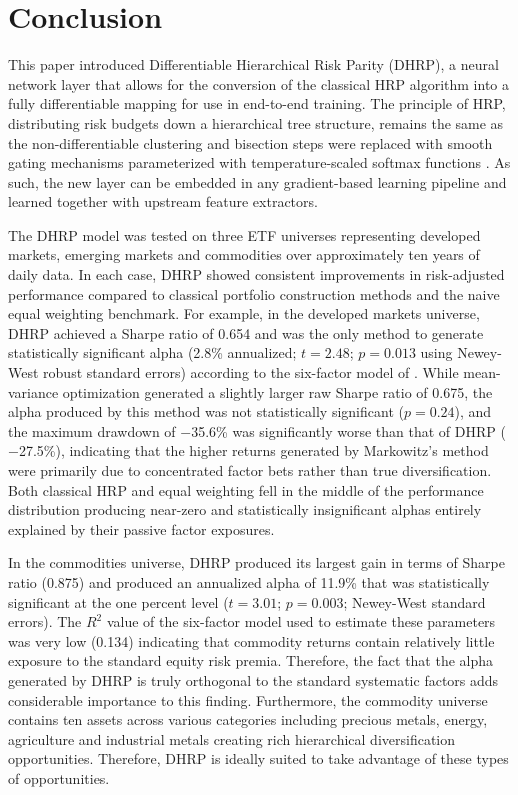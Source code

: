 \documentclass{article}
\begin{document}
\section{Conclusion}

This paper introduced Differentiable Hierarchical Risk Parity (DHRP), a neural network layer that allows for the conversion of the classical HRP algorithm \citep{LopezdePrado2016} into a fully differentiable mapping for use in end-to-end training. The principle of HRP, distributing risk budgets down a hierarchical tree structure, remains the same as the non-differentiable clustering and bisection steps were replaced with smooth gating mechanisms parameterized with temperature-scaled softmax functions \citep{Vaswani2017}. As such, the new layer can be embedded in any gradient-based learning pipeline and learned together with upstream feature extractors.

The DHRP model was tested on three ETF universes representing developed markets, emerging markets and commodities over approximately ten years of daily data. In each case, DHRP showed consistent improvements in risk-adjusted performance compared to classical portfolio construction methods and the naive equal weighting benchmark. For example, in the developed markets universe, DHRP achieved a Sharpe ratio of 0.654 and was the only method to generate statistically significant alpha (2.8\% annualized; $t=2.48$; $p=0.013$ using Newey-West robust standard errors) according to the six-factor model of \citet{FamaFrench2015, FamaFrench2018, Carhart1997}. While \citet{Markowitz1952} mean-variance optimization generated a slightly larger raw Sharpe ratio of 0.675, the alpha produced by this method was not statistically significant ($p=0.24$), and the maximum drawdown of $-$35.6\% was significantly worse than that of DHRP ($-$27.5\%), indicating that the higher returns generated by Markowitz's method were primarily due to concentrated factor bets rather than true diversification. Both classical HRP and equal weighting fell in the middle of the performance distribution producing near-zero and statistically insignificant alphas entirely explained by their passive factor exposures.

In the commodities universe, DHRP produced its largest gain in terms of Sharpe ratio (0.875) and produced an annualized alpha of 11.9\% that was statistically significant at the one percent level ($t = 3.01$; $p = 0.003$; Newey-West standard errors). The $R^2$ value of the six-factor model used to estimate these parameters was very low (0.134) indicating that commodity returns contain relatively little exposure to the standard equity risk premia. Therefore, the fact that the alpha generated by DHRP is truly orthogonal to the standard systematic factors adds considerable importance to this finding. Furthermore, the commodity universe contains ten assets across various categories including precious metals, energy, agriculture and industrial metals creating rich hierarchical diversification opportunities. Therefore, DHRP is ideally suited to take advantage of these types of opportunities.
\end{document}
